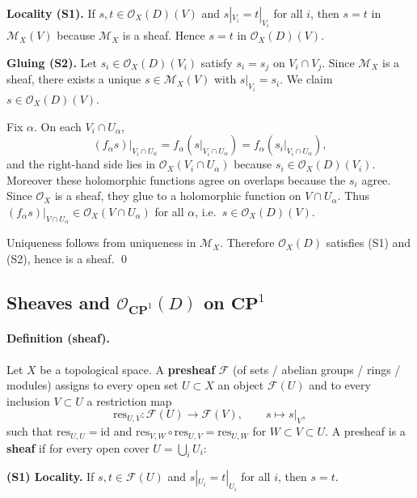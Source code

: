 \documentclass[11pt,openany]{article}
\renewcommand{\emph}[1]{\textbf{#1}}
\begin{document}
\smallskip
\noindent\emph{Locality (S1).}
If $s,t\in\mathcal O_X(D)(V)$ and $s|_{V_i}=t|_{V_i}$ for all $i$, then $s=t$ in $\mathcal M_X(V)$
because $\mathcal M_X$ is a sheaf. Hence $s=t$ in $\mathcal O_X(D)(V)$.

\smallskip
\noindent\emph{Gluing (S2).}
Let $s_i\in\mathcal O_X(D)(V_i)$ satisfy $s_i=s_j$ on $V_i\cap V_j$.
Since $\mathcal M_X$ is a sheaf, there exists a unique $s\in\mathcal M_X(V)$ with $s|_{V_i}=s_i$.
We claim $s\in\mathcal O_X(D)(V)$.

Fix $\alpha$. On each $V_i\cap U_\alpha$,
\[
(f_\alpha s)|_{V_i\cap U_\alpha}=f_\alpha(s|_{V_i\cap U_\alpha})=f_\alpha(s_i|_{V_i\cap U_\alpha}),
\]
and the right-hand side lies in $\mathcal O_X(V_i\cap U_\alpha)$ because $s_i\in\mathcal O_X(D)(V_i)$.
Moreover these holomorphic functions agree on overlaps because the $s_i$ agree.
Since $\mathcal O_X$ is a sheaf, they glue to a holomorphic function on $V\cap U_\alpha$.
Thus $(f_\alpha s)|_{V\cap U_\alpha}\in\mathcal O_X(V\cap U_\alpha)$ for all $\alpha$, i.e.\ $s\in\mathcal O_X(D)(V)$.

Uniqueness follows from uniqueness in $\mathcal M_X$.
Therefore $\mathcal O_X(D)$ satisfies (S1) and (S2), hence is a sheaf.
\qed

\newpage

\subsection*{Sheaves and $\mathcal O_{\mathbf{CP}^1}(D)$ on $\mathbf{CP}^1$}

\paragraph{Definition (sheaf).}
Let $X$ be a topological space. A \emph{presheaf} $\mathcal F$ (of sets / abelian groups / rings / modules)
assigns to every open set $U\subset X$ an object $\mathcal F(U)$ and to every inclusion $V\subset U$
a restriction map
\[
\mathrm{res}_{U,V}:\mathcal F(U)\to \mathcal F(V),\qquad s\mapsto s|_V,
\]
such that $\mathrm{res}_{U,U}=\mathrm{id}$ and $\mathrm{res}_{V,W}\circ \mathrm{res}_{U,V}=\mathrm{res}_{U,W}$
for $W\subset V\subset U$.
A presheaf is a \emph{sheaf} if for every open cover $U=\bigcup_i U_i$:

\smallskip
\noindent\textbf{(S1) Locality.}
If $s,t\in \mathcal F(U)$ and $s|_{U_i}=t|_{U_i}$ for all $i$, then $s=t$.
\end{document}
